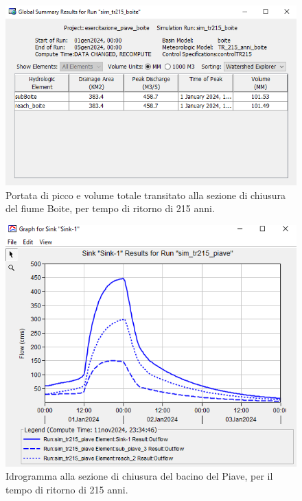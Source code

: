 \begin{figure}[H] \centering
\includegraphics[scale=0.6]{immagini/risul_boite_215.PNG}
\caption{Portata di picco e volume totale transitato alla sezione di chiusura del fiume Boite, per tempo di ritorno di 215 anni.}
\label{figure:risul_boite_215}
\end{figure}

\begin{figure}[H] \centering
\includegraphics[scale=0.6]{immagini/sink_piave_215.PNG}
\caption{Idrogramma alla sezione di chiusura del bacino del Piave, per il tempo di ritorno di 215 anni.}
\label{figure:sink_piave_215}    
\end{figure}

